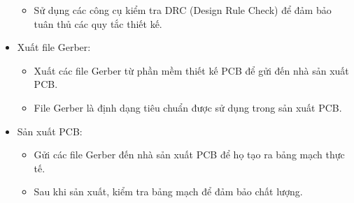 \documentclass{article}
\begin{document}
\begin{itemize}
\begin{itemize}
        \item Sử dụng các công cụ kiểm tra DRC (Design Rule Check) để đảm bảo tuân thủ các quy tắc thiết kế.
    \end{itemize}
    \item Xuất file Gerber:
    \begin{itemize}
        \item Xuất các file Gerber từ phần mềm thiết kế PCB để gửi đến nhà sản xuất PCB.
        \item File Gerber là định dạng tiêu chuẩn được sử dụng trong sản xuất PCB.
    \end{itemize}
    \item Sản xuất PCB:
    \begin{itemize}
        \item Gửi các file Gerber đến nhà sản xuất PCB để họ tạo ra bảng mạch thực tế.
        \item Sau khi sản xuất, kiểm tra bảng mạch để đảm bảo chất lượng.
    \end{itemize}
\end{itemize}
\end{document}
